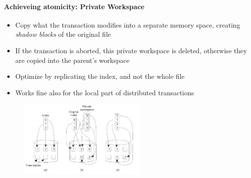 \documentclass[10pt,a4paper]{article}
\begin{document}
\paragraph{Achieveing atomicity: Private Workspace}
\begin{itemize}
	\item Copy what the transaction modifies into a separate memory space, creating \textit{shadow blocks} of the original file
	\item If the transaction is aborted, this private workspace is deleted, otherwise they are copied into the parent's workspace
	\item Optimize by replicating the index, and not the whole file
	\item Works fine also for the local part of distributed transactions
\end{itemize}
\begin{figure}[h!]
 \hfill \includegraphics[width=180pt]{images/private-workspace.png}\hspace*{\fill}
  \label{fig:private-workspace}
\end{figure} 
\end{document}
